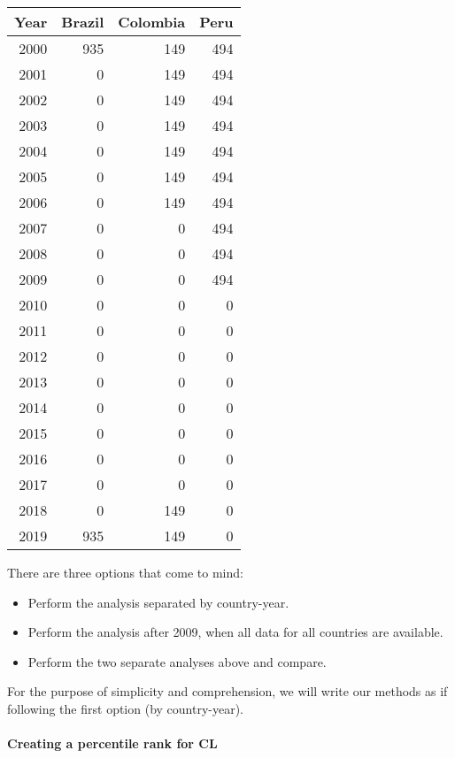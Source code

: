 \documentclass[
]{article}
\providecommand{\tightlist}{%
  \setlength{\itemsep}{0pt}\setlength{\parskip}{0pt}}
\begin{document}
\begin{table}
\centering
\begin{tabular}{r|r|r|r}
\hline
Year & Brazil & Colombia & Peru\\
\hline
2000 & 935 & 149 & 494\\
\hline
2001 & 0 & 149 & 494\\
\hline
2002 & 0 & 149 & 494\\
\hline
2003 & 0 & 149 & 494\\
\hline
2004 & 0 & 149 & 494\\
\hline
2005 & 0 & 149 & 494\\
\hline
2006 & 0 & 149 & 494\\
\hline
2007 & 0 & 0 & 494\\
\hline
2008 & 0 & 0 & 494\\
\hline
2009 & 0 & 0 & 494\\
\hline
2010 & 0 & 0 & 0\\
\hline
2011 & 0 & 0 & 0\\
\hline
2012 & 0 & 0 & 0\\
\hline
2013 & 0 & 0 & 0\\
\hline
2014 & 0 & 0 & 0\\
\hline
2015 & 0 & 0 & 0\\
\hline
2016 & 0 & 0 & 0\\
\hline
2017 & 0 & 0 & 0\\
\hline
2018 & 0 & 149 & 0\\
\hline
2019 & 935 & 149 & 0\\
\hline
\end{tabular}
\end{table}

There are three options that come to mind:

\begin{itemize}
\tightlist
\item
  Perform the analysis separated by country-year.
\item
  Perform the analysis after 2009, when all data for all countries are
  available.
\item
  Perform the two separate analyses above and compare.
\end{itemize}

For the purpose of simplicity and comprehension, we will write our
methods as if following the first option (by country-year).

\hypertarget{creating-a-percentile-rank-for-cl}{%
\paragraph{Creating a percentile rank for
CL}\label{creating-a-percentile-rank-for-cl}}
\end{document}
